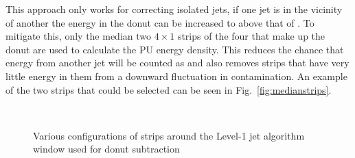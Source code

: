 This approach only works for correcting isolated jets, if one jet is
in the vicinity of another the energy in the donut can be increased to
above that of \PU. To mitigate this, only the median two $4\times1$
\TT strips of the four that make up the donut are used to calculate
the PU energy density. This reduces the chance that energy from
another jet will be counted as \PU and also removes strips that have
very little energy in them from a downward fluctuation in \PU
contamination. An example of the two strips that could be selected can
be seen in Fig.~\ref{fig:medianstrips}.

\begin{figure}[!t]
  \centering
  ~ 
  ~
  \\
  \caption{Various configurations of \TT strips around the Level-1 jet
  algorithm window used for donut subtraction}
  \label{fig:alldonutstrips}
\end{figure}

